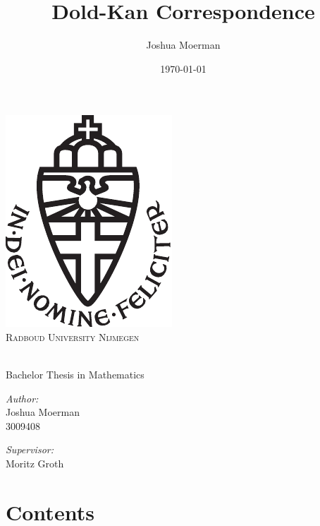 \documentclass[titlepage, 11pt]{amsproc}
\title{Dold-Kan Correspondence}
\author{Joshua Moerman}
\date{\today}
\theoremstyle{plain}
\theoremstyle{definition}
\begin{document}
\begin{titlepage}
\centering
\vspace{10cm}

\includegraphics[scale=0.2]{ru}\\
\textsc{Radboud University Nijmegen}
\vspace{3cm}

{\huge \bfseries \makeatletter\@title\makeatother}\\
\vspace{0.3cm}
Bachelor Thesis in Mathematics
\vspace{3cm}

\begin{minipage}{0.4\textwidth}
\begin{flushleft} \large
\emph{Author:}\\
Joshua Moerman\\
3009408
\end{flushleft}
\end{minipage}
\begin{minipage}{0.4\textwidth}
\begin{flushright} \large
\emph{Supervisor:} \\
Moritz Groth
\end{flushright}
\end{minipage}

\vfill
\makeatletter\@date\makeatother

\end{titlepage}

\section*{Contents}
\renewcommand\contentsname{}
\tableofcontents
\end{document}
